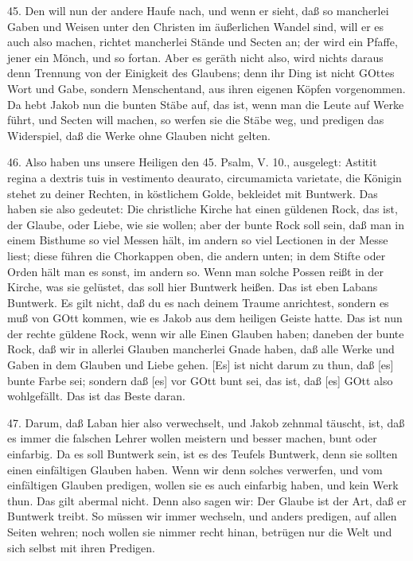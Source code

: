 45. Den will nun der andere Haufe nach, und wenn er sieht, daß so mancherlei Gaben
und Weisen unter den Christen im äußerlichen Wandel sind, will er es auch also machen, richtet mancherlei Stände und Secten an; der wird ein Pfaffe, jener ein Mönch, und so fortan. Aber es geräth nicht also, wird nichts daraus denn Trennung von der Einigkeit des Glaubens; denn ihr Ding ist nicht GOttes Wort und Gabe, sondern Menschentand, aus ihren eigenen Köpfen vorgenommen. Da hebt Jakob nun die bunten Stäbe auf, das ist, wenn man die Leute auf Werke führt, und Secten will machen, so werfen sie die Stäbe weg, und predigen das Widerspiel, daß die Werke ohne Glauben nicht gelten.

46. Also haben uns unsere Heiligen den 45. Psalm, V. 10., ausgelegt: Astitit regina a dextris tuis in vestimento deaurato, circumamicta varietate, die Königin stehet zu deiner Rechten, in köstlichem Golde, bekleidet mit Buntwerk. Das haben sie also gedeutet: Die christliche Kirche hat einen güldenen Rock, das ist, der Glaube, oder Liebe, wie sie wollen; aber der bunte Rock soll sein, daß man in einem Bisthume so viel Messen hält, im andern so viel Lectionen in der Messe liest; diese führen die Chorkappen oben, die andern unten; in dem Stifte oder Orden hält man es sonst, im andern so. Wenn man solche Possen reißt in der Kirche, was sie gelüstet, das soll hier Buntwerk heißen. Das ist eben Labans Buntwerk. Es gilt nicht, daß du es nach deinem Traume anrichtest, sondern es muß von GOtt kommen, wie es Jakob aus dem heiligen Geiste hatte. Das ist nun der rechte güldene Rock, wenn wir alle Einen Glauben haben; daneben der bunte Rock, daß wir in allerlei Glauben mancherlei Gnade haben, daß alle Werke und Gaben in dem Glauben und Liebe gehen. [Es] ist nicht darum zu thun, daß [es] bunte Farbe sei; sondern daß [es] vor GOtt bunt sei, das ist, daß [es] GOtt also wohlgefällt. Das ist das Beste daran.

47. Darum, daß Laban hier also verwechselt, und Jakob zehnmal täuscht, ist, daß es immer die falschen Lehrer wollen meistern und besser machen, bunt oder einfarbig. Da es soll Buntwerk sein, ist es des Teufels Buntwerk, denn sie sollten einen einfältigen Glauben haben. Wenn wir denn solches verwerfen, und vom einfältigen Glauben predigen, wollen sie es auch einfarbig haben, und kein Werk thun. Das gilt abermal nicht. Denn also sagen wir: Der Glaube ist der Art, daß er Buntwerk treibt. So müssen wir immer wechseln, und anders predigen, auf allen Seiten wehren; noch wollen sie nimmer recht hinan, betrügen nur die Welt und sich selbst mit ihren Predigen.


